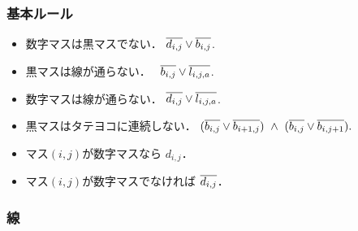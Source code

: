 \documentclass[a4j]{jarticle}
\newcommand{\N}[1]{\overline{#1\vphantom{l}}}
\newcommand{\←}{{\leftarrow}}
\newcommand{\→}{{\rightarrow}}
\newcommand{\↑}{{\uparrow}}
\newcommand{\↓}{{\downarrow}}
\begin{document}
\subsubsection{基本ルール}
\begin{itemize}
\item 数字マスは黒マスでない．
  $\N{d_{i,j}}\lor\N{b_{i,j}}$.


\item 黒マスは線が通らない．　
  $\N{b_{i,j}}\lor\N{l_{i,j,a}}$.

\item 数字マスは線が通らない．
  $\N{d_{i,j}}\lor\N{l_{i,j,a}}$.

\item 黒マスはタテヨコに連続しない．
  \quad
  $
    (\N{b_{i,j}}\lor\N{b_{i+1,j}})
   \ \land\
    (\N{b_{i,j}}\lor\N{b_{i,j+1}}).
  $

\item マス$(i,j)$が数字マスなら $d_{i,j}$．
\item マス$(i,j)$が数字マスでなければ $\N{d_{i,j}}$．
\end{itemize}

\subsubsection{線}
\end{document}
